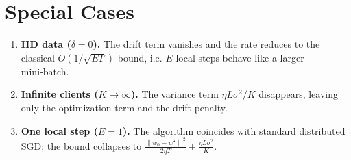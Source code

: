 \documentclass{article}
\newcommand{\norm}[1]{\left\|#1\right\|}
\begin{document}
\section*{Special Cases}
\begin{enumerate}[label={\alph*.}]
    \item \textbf{IID data ($\delta=0$).} The drift term vanishes and the rate reduces to the classical $O(1/\sqrt{ET})$ bound, i.e. $E$ local steps behave like a larger mini‑batch.
    \item \textbf{Infinite clients ($K\to\infty$).} The variance term $\eta L\sigma^{2}/K$ disappears, leaving only the optimization term and the drift penalty.
    \item \textbf{One local step ($E=1$).} The algorithm coincides with standard distributed SGD; the bound collapses to
    $\frac{\norm{w_0-w^\star}^{2}}{2\eta T}+\frac{\eta L\sigma^{2}}{K}$.
\end{enumerate}
\end{document}
